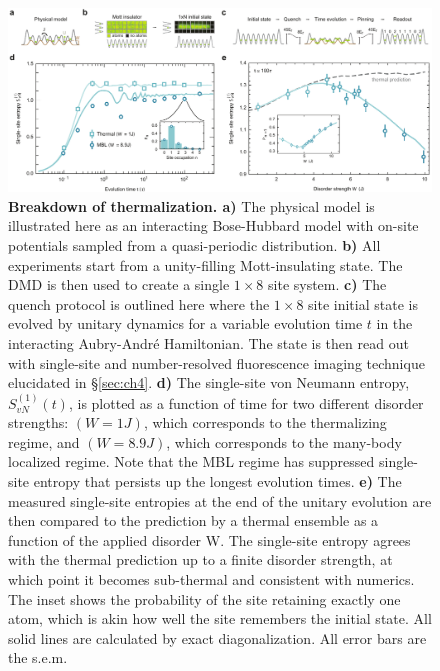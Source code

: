 \begin{figure}[t!]
		\includegraphics[width=\columnwidth]{figures/ch5/figure2.pdf} 
		\caption{\textbf{Breakdown of thermalization. a)} The physical model is illustrated here as an interacting Bose-Hubbard model with on-site potentials sampled from a quasi-periodic distribution. \textbf{b)} All experiments start from a unity-filling Mott-insulating state. The DMD is then used to create a single $1\times8$ site system. \textbf{c)} The quench protocol is outlined here where the $1\times8$ site initial state is evolved by unitary dynamics for a variable evolution time $t$ in the interacting Aubry-Andr\'e Hamiltonian. The state is then read out with single-site and number-resolved fluorescence imaging technique elucidated in \S \ref{sec:ch4}. \textbf{d)} The single-site von Neumann entropy, $S^{(1)}_{vN}(t)$, is plotted as a function of time for two different disorder strengths: $(W=1J)$, which corresponds to the thermalizing regime, and $(W=8.9J)$, which corresponds to the many-body localized regime. Note that the MBL regime has suppressed single-site entropy that persists up the longest evolution times. \textbf{e)} The measured single-site entropies at the end of the unitary evolution are then compared to the prediction by a thermal ensemble as a function of the applied disorder W. The single-site entropy agrees with the thermal prediction up to a finite disorder strength, at which point it becomes sub-thermal and consistent with numerics. The inset shows the probability of the site retaining exactly one atom, which is akin how well the site remembers the initial state. All solid lines are calculated by exact diagonalization. All error bars are the s.e.m.}
		\label{fig:ch5fig2}	
\end{figure}

